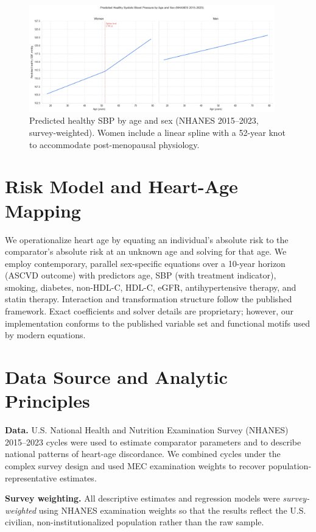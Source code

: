 \documentclass{article}
\begin{document}
\begin{figure}
  \centering
  \includegraphics[width=0.95\textwidth]{healthy_sbp_by_age.png}
  \caption{Predicted healthy SBP by age and sex (NHANES 2015--2023, survey-weighted). Women include a linear spline with a 52-year knot to accommodate post-menopausal physiology.}
  \label{fig:healthy-sbp}
\end{figure}

\section{Risk Model and Heart-Age Mapping}
We operationalize heart age by equating an individual's absolute risk to the comparator's absolute risk at an unknown age and solving for that age. We employ contemporary, parallel sex-specific equations over a 10-year horizon (ASCVD outcome) with predictors age, SBP (with treatment indicator), smoking, diabetes, non-HDL-C, HDL-C, eGFR, antihypertensive therapy, and statin therapy. Interaction and transformation structure follow the published framework. Exact coefficients and solver details are proprietary; however, our implementation conforms to the published variable set and functional motifs used by modern equations.

\section{Data Source and Analytic Principles}
\textbf{Data.} U.S. National Health and Nutrition Examination Survey (NHANES) 2015--2023 cycles were used to estimate comparator parameters and to describe national patterns of heart-age discordance. We combined cycles under the complex survey design and used MEC examination weights to recover population-representative estimates.

\textbf{Survey weighting.} All descriptive estimates and regression models were \emph{survey-weighted} using NHANES examination weights so that the results reflect the U.S. civilian, non-institutionalized population rather than the raw sample.
\end{document}

